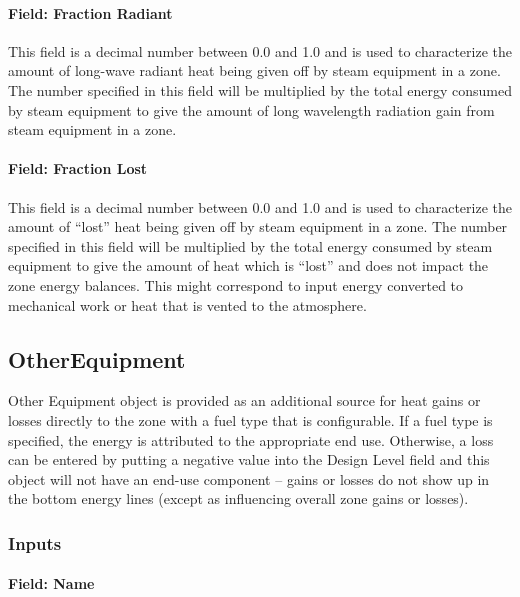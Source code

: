 \paragraph{Field: Fraction Radiant}\label{field-fraction-radiant-5-steam-definition}

This field is a decimal number between 0.0 and 1.0 and is used to characterize the amount of long-wave radiant heat being given off by steam equipment in a zone. The number specified in this field will be multiplied by the total energy consumed by steam equipment to give the amount of long wavelength radiation gain from steam equipment in a zone.

\paragraph{Field: Fraction Lost}\label{field-fraction-lost-3-steam-definition}

This field is a decimal number between 0.0 and 1.0 and is used to characterize the amount of ``lost'' heat being given off by steam equipment in a zone. The number specified in this field will be multiplied by the total energy consumed by steam equipment to give the amount of heat which is ``lost'' and does not impact the zone energy balances. This might correspond to input energy converted to mechanical work or heat that is vented to the atmosphere.

\subsection{OtherEquipment}\label{otherequipment}

Other Equipment object is provided as an additional source for heat gains or losses directly to the zone with a fuel type that is configurable. If a fuel type is specified, the energy is attributed to the appropriate end use. Otherwise, a loss can be entered by putting a negative value into the Design Level field and this object will not have an end-use component -- gains or losses do not show up in the bottom energy lines (except as influencing overall zone gains or losses).

\subsubsection{Inputs}\label{inputs-8-010}

\paragraph{Field: Name}\label{field-name-8-008}

